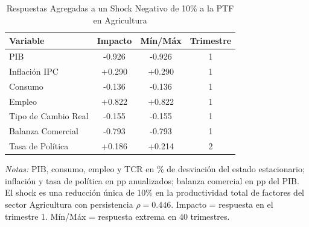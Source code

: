 \begin{table}[htbp]
\centering
\caption{Respuestas Agregadas a un Shock Negativo de 10\% a la PTF en Agricultura}
\label{tab:agr_agg}
\begin{threeparttable}
\begin{tabular}{@{}l c c c@{}}
\toprule
Variable & Impacto & Mín/Máx & Trimestre \\
\midrule
PIB & -0.926 & -0.926 & 1 \\
Inflación IPC & +0.290 & +0.290 & 1 \\
Consumo & -0.136 & -0.136 & 1 \\
Empleo & +0.822 & +0.822 & 1 \\
Tipo de Cambio Real & -0.155 & -0.155 & 1 \\
Balanza Comercial & -0.793 & -0.793 & 1 \\
Tasa de Política & +0.186 & +0.214 & 2 \\
\bottomrule
\end{tabular}
\begin{tablenotes}[flushleft]
\footnotesize
\item \textit{Notas:} PIB, consumo, empleo y TCR en \% de desviación del estado estacionario; inflación y tasa de política en pp anualizados; balanza comercial en pp del PIB. El shock es una reducción única de 10\% en la productividad total de factores del sector Agricultura con persistencia $\rho = 0.446$. Impacto = respuesta en el trimestre 1. Mín/Máx = respuesta extrema en 40 trimestres.
\end{tablenotes}
\end{threeparttable}
\end{table}
